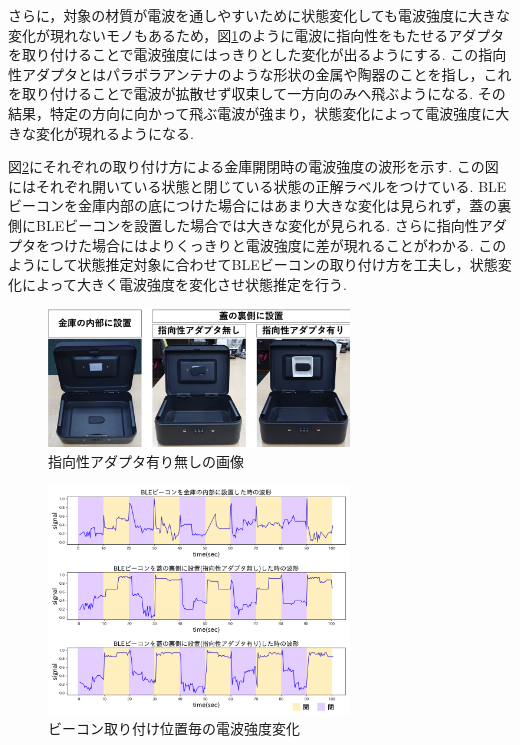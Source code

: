 \documentclass[Japanese]{dicomopapers}
\begin{document}
さらに，対象の材質が電波を通しやすいために状態変化しても電波強度に大きな変化が現れないモノもあるため，図\ref{adapter}のように電波に指向性をもたせるアダプタを取り付けることで電波強度にはっきりとした変化が出るようにする.
この指向性アダプタとはパラボラアンテナのような形状の金属や陶器のことを指し，これを取り付けることで電波が拡散せず収束して一方向のみへ飛ぶようになる.
その結果，特定の方向に向かって飛ぶ電波が強まり，状態変化によって電波強度に大きな変化が現れるようになる.

図\ref{transform-data}にそれぞれの取り付け方による金庫開閉時の電波強度の波形を示す.
この図にはそれぞれ開いている状態と閉じている状態の正解ラベルをつけている.
BLEビーコンを金庫内部の底につけた場合にはあまり大きな変化は見られず，蓋の裏側にBLEビーコンを設置した場合では大きな変化が見られる.
さらに指向性アダプタをつけた場合にはよりくっきりと電波強度に差が現れることがわかる.
このようにして状態推定対象に合わせてBLEビーコンの取り付け方を工夫し，状態変化によって大きく電波強度を変化させ状態推定を行う.


\begin{figure}[ht]
    \centering
    \includegraphics[width=8cm]{adapta_compare2.png}
    \caption{指向性アダプタ有り無しの画像}
    \label{adapter}
   \end{figure}


\begin{figure}[ht]
    \centering
    \includegraphics[width=8cm]{in-out.png}
    \caption{ビーコン取り付け位置毎の電波強度変化}
    \label{transform-data}
\end{figure}
\end{document}
